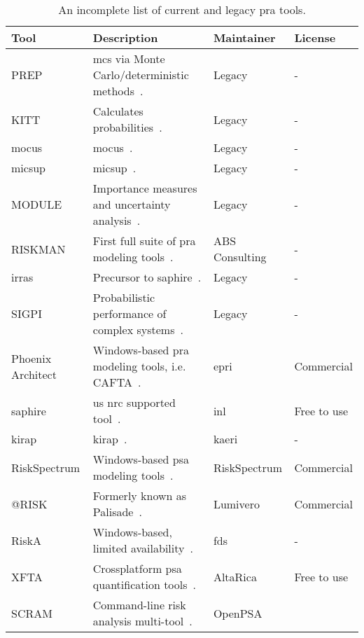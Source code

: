 \begin{table}
\centering
\caption{An incomplete list of current and legacy \acrlong{pra} tools.}
\label{tab:pra_tools_overview}
\begin{tabular}{@{}llll@{}}
\toprule
\textbf{Tool} &
  \textbf{Description} &
  \textbf{Maintainer} &
  \textbf{License} \\ \midrule

PREP &
  \acrshort{mcs} via Monte Carlo/deterministic methods~\cite{vesely_prep_1970}.&
  Legacy &
  - \\
KITT &
  Calculates probabilities~\cite{vesely_prep_1997}. &
  Legacy &
  - \\
\acrshort{mocus} &
  \acrlong{mocus}~\cite{Fussell1974MOCUS}. &
  Legacy &
  - \\
\acrshort{micsup} &
  \acrlong{micsup}~\cite{micsup}. &
  Legacy &
  - \\
MODULE &
  Importance measures and uncertainty analysis~\cite{module}. &
  Legacy &
  - \\
RISKMAN &
  First full suite of \acrshort{pra} modeling tools~\cite{riskman1,riskman2}. &
  ABS Consulting &
  - \\
\acrshort{irras}  &
  Precursor to \acrshort{saphire}~\cite{irras1,irras2}. &
  Legacy &
  - \\
SIGPI &
  Probabilistic performance of complex systems~\cite{sigpi}. &
  Legacy &
  - \\
Phoenix Architect &
  Windows-based \acrshort{pra} modeling tools, i.e. CAFTA~\cite{cafta1,cafta2}. &
  \acrshort{epri} &
  Commercial \\
\acrshort{saphire} &
  \acrshort{us} \acrshort{nrc} supported tool~\cite{saphire1,SAPHIRE,saphire_manual}. &
  \acrshort{inl} &
  Free to use \\
\acrshort{kirap} &
  {\acrlong{kirap}}~\cite{kirap}. &
  \acrshort{kaeri} &
  - \\
{RiskSpectrum} &
  Windows-based \acrshort{psa} modeling tools~\cite{riskspectrum1}. &
{RiskSpectrum} &
  Commercial \\
@RISK &
  Formerly known as Palisade~\cite{palisade1,palisade12}. &
  Lumivero &
  Commercial \\
RiskA &
  Windows-based, limited availability~\cite{riska1}. &
  \acrshort{fds} &
  - \\
XFTA &
  Crossplatform \acrshort{psa} quantification tools~\cite{xfta1}. &
  AltaRica &
  Free to use \\
SCRAM &
  Command-line risk analysis multi-tool~\cite{scram}. &
  OpenPSA &

\end{tabular}
\end{table}
